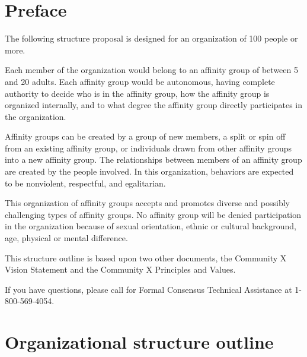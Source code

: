 \section*{Preface}

The following structure proposal is designed for an organization of 100 people or more.

Each member of the organization would belong to an affinity group of between 5 and 20 adults. Each affinity group would be autonomous, having complete authority to decide who is in the affinity group, how the affinity group is organized internally, and to what degree the affinity group directly participates in the organization.

Affinity groups can be created by a group of new members, a split or spin off from an existing affinity group, or individuals drawn from other affinity groups into a new affinity group. The relationships between members of an affinity group are created by the people involved. In this organization, behaviors are expected to be nonviolent, respectful, and egalitarian.

This organization of affinity groups accepts and promotes diverse and possibly challenging types of affinity groups. No affinity group will be denied participation in the organization because of sexual orientation, ethnic or cultural background, age, physical or mental difference.

This structure outline is based upon two other documents, the Community X Vision Statement and the Community X Principles and Values.

If you have questions, please call for Formal Consensus Technical Assistance at 1-800-569-4054.

\section*{Organizational structure outline}

